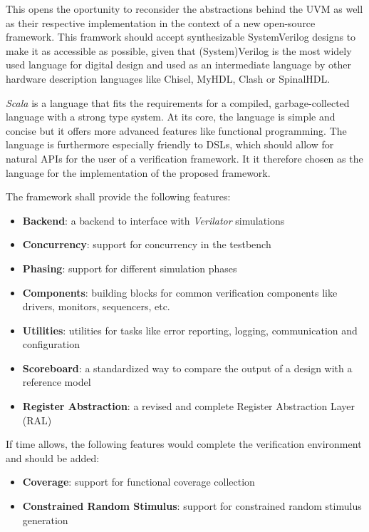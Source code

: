 \documentclass[11pt]{article}
\begin{document}
This opens the oportunity to reconsider the abstractions behind the UVM as well as their respective implementation in the context of a new open-source framework. This framwork should accept synthesizable SystemVerilog designs to make it as accessible as possible, given that (System)Verilog is the most widely used language for digital design and used as an intermediate language by other hardware description languages like Chisel, MyHDL, Clash or SpinalHDL.

\textit{Scala} is a language that fits the requirements for a compiled, garbage-collected language with a strong type system. At its core, the language is simple and concise but it offers more advanced features like functional programming. The language is furthermore especially friendly to DSLs, which should allow for natural APIs for the user of a verification framework. It it therefore chosen as the language for the implementation of the proposed framework.


\noindent The framework shall provide the following features:

\begin{itemize}
    \item \textbf{Backend}: a backend to interface with \textit{Verilator} simulations
    \item \textbf{Concurrency}: support for concurrency in the testbench
    \item \textbf{Phasing}: support for different simulation phases
    \item \textbf{Components}: building blocks for common verification components like drivers, monitors, sequencers, etc.
    \item \textbf{Utilities}: utilities for tasks like error reporting, logging, communication and configuration
    \item \textbf{Scoreboard}: a standardized way to compare the output of a design with a reference model
    \item \textbf{Register Abstraction}: a revised and complete Register Abstraction Layer (RAL)
\end{itemize}

\noindent If time allows, the following features would complete the verification environment and should be added:

\begin{itemize}
    \item \textbf{Coverage}: support for functional coverage collection
    \item \textbf{Constrained Random Stimulus}: support for constrained random stimulus generation
\end{itemize}
\end{document}
